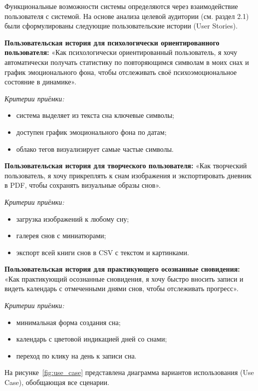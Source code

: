 \documentclass[14pt, a4paper]{extarticle}
\begin{document}
Функциональные возможности системы определяются через взаимодействие пользователя с системой. На основе анализа целевой аудитории (см. раздел 2.1) были сформулированы следующие пользовательские истории (User Stories).

\textbf{Пользовательская история для психологически ориентированного пользователя:} «Как психологически ориентированный пользователь, я хочу автоматически получать статистику по повторяющимся символам в моих снах и график эмоционального фона, чтобы отслеживать своё психоэмоциональное состояние в динамике».

\textit{Критерии приёмки:}
\begin{itemize}
    \item система выделяет из текста сна ключевые символы;
    \item доступен график эмоционального фона по датам;
    \item облако тегов визуализирует самые частые символы.
\end{itemize}

\textbf{Пользовательская история для творческого пользователя:} «Как творческий пользователь, я хочу прикреплять к снам изображения и экспортировать дневник в PDF, чтобы сохранять визуальные образы снов».

\textit{Критерии приёмки:}
\begin{itemize}
    \item загрузка изображений к любому сну;
    \item галерея снов с миниатюрами;
    \item экспорт всей книги снов в CSV с текстом и картинками.
\end{itemize}

\textbf{Пользовательская история для практикующего осознанные сновидения:} «Как практикующий осознанные сновидения, я хочу быстро вносить записи и видеть календарь с отмеченными днями снов, чтобы отслеживать прогресс».

\textit{Критерии приёмки:}
\begin{itemize}
    \item минимальная форма создания сна;
    \item календарь с цветовой индикацией дней со снами;
    \item переход по клику на день к записи сна.
\end{itemize}

На рисунке~\ref{fig:use_case} представлена диаграмма вариантов использования (Use Case), обобщающая все сценарии.
\end{document}
